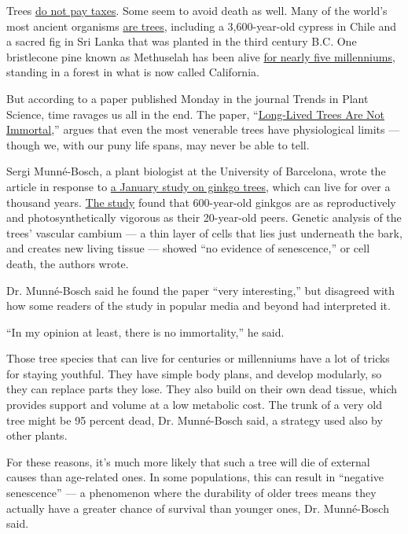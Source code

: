 Trees
\href{https://dghaskell.com/2016/02/03/the-tree-that-owns-itself/}{do
not pay taxes}. Some seem to avoid death as well. Many of the world's
most ancient organisms \href{http://www.rmtrr.org/oldlist.htm}{are
trees}, including a 3,600-year-old cypress in Chile and a sacred fig in
Sri Lanka that was planted in the third century B.C. One bristlecone
pine known as Methuselah has been alive
\href{https://www.nytimes.com/2003/06/17/science/at-age-4600-plus-methuselah-pine-tree-begets-new-offspring.html}{for
nearly five millenniums}, standing in a forest in what is now called
California.

But according to a paper published Monday in the journal Trends in Plant
Science, time ravages us all in the end. The paper,
``\href{https://doi.org/10.1016/j.tplants.2020.06.006}{Long-Lived Trees
Are Not Immortal},'' argues that even the most venerable trees have
physiological limits --- though we, with our puny life spans, may never
be able to tell.

Sergi Munné-Bosch, a plant biologist at the University of Barcelona,
wrote the article in response to
\href{https://www.nytimes.com/2020/01/13/science/oldest-trees-ginkgos.html}{a
January study on ginkgo trees}, which can live for over a thousand
years. \href{https://www.pnas.org/content/117/4/2201}{The study} found
that 600-year-old ginkgos are as reproductively and photosynthetically
vigorous as their 20-year-old peers. Genetic analysis of the trees'
vascular cambium --- a thin layer of cells that lies just underneath the
bark, and creates new living tissue --- showed ``no evidence of
senescence,'' or cell death, the authors wrote.

Dr. Munné-Bosch said he found the paper ``very interesting,'' but
disagreed with how some readers of the study in popular media and beyond
had interpreted it.

``In my opinion at least, there is no immortality,'' he said.

Those tree species that can live for centuries or millenniums have a lot
of tricks for staying youthful. They have simple body plans, and develop
modularly, so they can replace parts they lose. They also build on their
own dead tissue, which provides support and volume at a low metabolic
cost. The trunk of a very old tree might be 95 percent dead, Dr.
Munné-Bosch said, a strategy used also by other plants.

For these reasons, it's much more likely that such a tree will die of
external causes than age-related ones. In some populations, this can
result in ``negative senescence'' --- a phenomenon where the durability
of older trees means they actually have a greater chance of survival
than younger ones, Dr. Munné-Bosch said.

